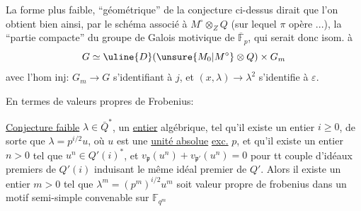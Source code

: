 
La forme plus faible, ``géométrique'' de la conjecture ci-dessus dirait que  l'on obtient bien ainsi, par le schéma associé à $M^\circ\otimes_ZQ$ (sur lequel $\pi$ opère ...), la  ``partie compacte'' du  groupe de Galois motivique de $\overline{\mathbb F}_p$, qui serait donc isom. à
\[
G\simeq\uline{D}(\unsure{M_0|M^\circ}\otimes Q)\times G_m
\]
avec l'hom inj: $G_m\longrightarrow G$ s'identifiant à $j$, et  $(x,\lambda)\longrightarrow\lambda^2$ s'identifie à $\varepsilon$.

En termes de valeurs propres de Frobenius:

\uline{Conjecture faible}  $\lambda\in\bar Q^*$,  un \uline{entier} algébrique,  tel qu'il existe un entier $i\geq0$, de sorte que $\lambda=p^{i/2}u$,  où $u$ est une \uline{unité absolue} \uline{exc.} $p$, et qu'il existe un entier $n>0$ tel que $u^n\in Q'(i)^*$, et $v_{\mathfrak p}(u^n)+v_{\mathfrak p'}(u^n)=0$ pour tt couple d'idéaux premiers de $Q'(i)$ induisant le même idéal premier de $Q'$. Alors il existe un entier $m>0$ tel que $\lambda^m=(p^m)^{i/2}u^m$ soit  valeur propre de frobenius  dans un motif semi-simple  convenable sur $\mathbb F_{q^m}$


